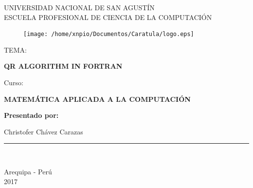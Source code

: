 \documentclass[a4paper,12pt]{article}
\begin{document}
\begin{titlepage}

\begin{center}
\vspace*{-1in}

\begin{large}
UNIVERSIDAD NACIONAL DE SAN AGUSTÍN\\
\vspace*{0.15in}
ESCUELA PROFESIONAL DE CIENCIA DE LA COMPUTACIÓN\\
\end{large}
\begin{figure}[htb]
\centering
\texttt{[image: /home/xnpio/Documentos/Caratula/logo.eps]}
\end{figure}
\vspace*{0.15in}
\begin{large}
TEMA:\\
\end{large}
\vspace*{0.2in}
\begin{Large}
\textbf{QR ALGORITHM IN FORTRAN} \\
\end{Large}
\vspace{8mm}

\begin{large}
Curso:\\
\end{large}
\vspace*{0.2in}
\begin{Large}
\textbf{MATEMÁTICA APLICADA A LA COMPUTACIÓN} \\
\end{Large}

\vspace{8mm}

\begin{large}
\textbf{Presentado por:}\\

\begin{flushleft}

\hspace{7cm} Christofer Chávez Carazas \\

\end{flushleft}
\end{large}
\vspace{4cm}
\rule{80mm}{0.1mm}\\
\vspace*{0.1in}

\begin{large}
Arequipa - Perú \\
2017 \\
\end{large}
\end{center}
\end{titlepage}
\end{document}
